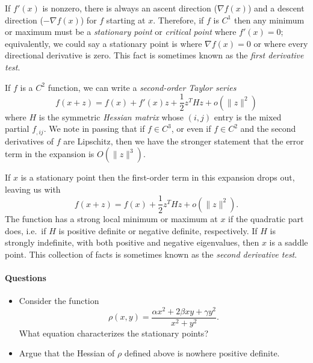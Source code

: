 \documentclass[12pt, leqno]{article} %
\begin{document}
If $f'(x)$ is nonzero, there is always an ascent direction ($\nabla
f(x)$) and a descent direction ($-\nabla f(x)$) for $f$ starting at
$x$.  Therefore, if $f$ is $C^1$ then any minimum or maximum must be a
{\em stationary point} or {\em critical point} where $f'(x) = 0$;
equivalently, we could say a stationary point is where
$\nabla f(x) = 0$ or where every directional derivative is zero.
This fact is sometimes known as the {\em first derivative test}.

If $f$ is a $C^2$ function, we can write a {\em second-order Taylor series}
\[
  f(x+z) = f(x) + f'(x) z + \frac{1}{2} z^T H z + o(\|z\|^2)
\]
where $H$ is the symmetric {\em Hessian matrix} whose $(i,j)$ entry is
the mixed partial $f_{,ij}$.  We note in passing that if $f \in C^3$,
or even if $f \in C^2$ and the second derivatives of $f$ are
Lipschitz, then we have the stronger statement that the error term in
the expansion is $O(\|z\|^3)$.

If $x$ is a stationary point then the first-order term in this
expansion drops out, leaving us with
\[
  f(x+z) = f(x) + \frac{1}{2} z^T H z + o(\|z\|^2).
\]
The function has a strong local minimum or maximum at $x$ if
the quadratic part does, i.e.~if $H$ is positive definite or
negative definite, respectively.  If $H$ is strongly indefinite,
with both positive and negative eigenvalues, then $x$ is a saddle
point.  This collection of facts is sometimes known as the
{\em second derivative test}.

\paragraph*{Questions}

\begin{itemize}
\item Consider the function
  \[
    \rho(x, y) = \frac{\alpha x^2 + 2 \beta xy + \gamma y^2}{x^2 + y^2}.
  \]
  What equation characterizes the stationary points?
\item Argue that the Hessian of $\rho$ defined above is nowhere
  positive definite.
\end{itemize}
\end{document}
